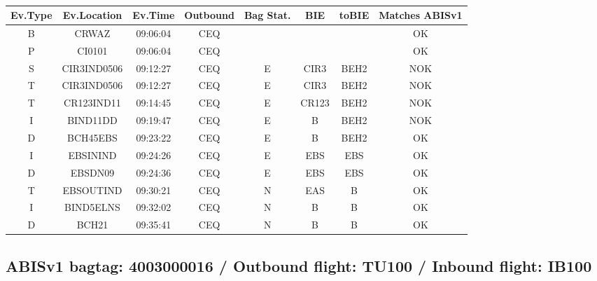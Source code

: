 \documentclass{report}
\begin{document}
\paragraph{}
\begin{longtable}{cccccccc}    \toprule
\rowcolor{white!50}
\textbf{Ev.Type} & \textbf{Ev.Location} & \textbf{Ev.Time} & \textbf{Outbound} & \textbf{Bag Stat.} & \textbf{BIE} & \textbf{toBIE} & \textbf{Matches ABISv1} \\\midrule
B & CRWAZ & 09:06:04  & CEQ &  &  &  & OK\\
P & CI0101 & 09:06:04  & CEQ &  &  &  & OK\\
S & CIR3IND0506 & 09:12:27  & CEQ & E & CIR3 & BEH2 & NOK\\
T & CIR3IND0506 & 09:12:27  & CEQ & E & CIR3 & BEH2 & NOK\\
T & CR123IND11 & 09:14:45  & CEQ & E & CR123 & BEH2 & NOK\\
I & BIND11DD & 09:19:47  & CEQ & E & B & BEH2 & NOK\\
D & BCH45EBS & 09:23:22  & CEQ & E & B & BEH2 & OK\\
I & EBSININD & 09:24:26  & CEQ & E & EBS & EBS & OK\\
D & EBSDN09 & 09:24:36  & CEQ & E & EBS & EBS & OK\\
T & EBSOUTIND & 09:30:21  & CEQ & N & EAS & B & OK\\
I & BIND5ELNS & 09:32:02  & CEQ & N & B & B & OK\\
D & BCH21 & 09:35:41  & CEQ & N & B & B & OK\\
\bottomrule
\end{longtable}
\subsection*{ABISv1 bagtag: 4003000016 / Outbound flight: TU100 / Inbound flight: IB100}
\end{document}

